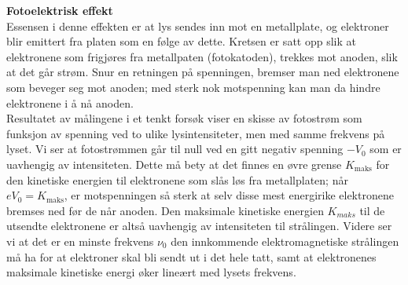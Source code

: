 \documentclass[8pt, A4paper, norsk]{extarticle}
\begin{document}
\begin{multicols*}{3}
\vspace{2mm}

\centering \textbf{Fotoelektrisk effekt} \\
Essensen i denne effekten er at lys sendes inn mot en metallplate, og elektroner blir emittert fra platen som en følge av dette. Kretsen er satt opp slik at elektronene som frigjøres fra metallpaten (fotokatoden), trekkes mot anoden, slik at det går strøm. Snur en retningen på spenningen, bremser man ned elektronene som beveger seg mot anoden; med sterk nok motspenning kan man da hindre elektronene i å nå anoden. \\
Resultatet av målingene i et tenkt forsøk viser en skisse av fotostrøm som funksjon av spenning ved to ulike lysintensiteter, men med samme frekvens på lyset. Vi ser at fotostrømmen går til null ved en gitt negativ spenning $-V_0$ som er uavhengig av intensiteten. Dette må bety at det finnes en øvre grense $K_{\text{maks}}$ for den kinetiske energien til elektronene som slås løs fra metallplaten; når $eV_0 = K_{\text{maks}}$, er motspenningen så sterk at selv disse mest energirike elektronene bremses ned før de når anoden. Den maksimale kinetiske energien $K_{maks}$ til de utsendte elektronene er altså uavhengig av intensiteten til strålingen. Videre ser vi at det er en minste frekvens $\nu_0$ den innkommende elektromagnetiske strålingen må ha for at elektroner skal bli sendt ut i det hele tatt, samt at elektronenes maksimale kinetiske energi øker lineært med lysets frekvens.

\vspace{2mm}


\end{multicols*}
\end{document}
